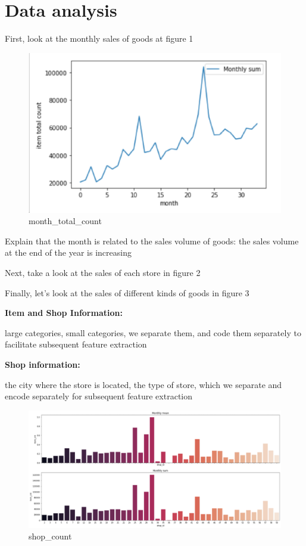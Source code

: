 \documentclass{amsart}
\begin{document}
\section{Data analysis}
First, look at the monthly sales of goods at figure 1\par
    \begin{figure}
        \includegraphics[scale=0.3]{picture/data_20.eps}
        \caption{month_total_count}\label{fig:1}
    \end{figure}
    Explain that the month is related to the sales volume of goods: the sales volume at the end of the year is increasing\par
    Next, take a look at the sales of each store in figure 2\par
    Finally, let's look at the sales of different kinds of goods in figure 3\par
    \textbf{Item and Shop Information:}\par
    large categories, small categories, we separate them, and code them separately to facilitate subsequent feature extraction\par
    \textbf{Shop information:}\par
    the city where the store is located, the type of store, which we separate and encode separately for subsequent feature extraction\par
    \begin{figure}[b]
        \includegraphics[scale=0.3]{picture/data_30.eps}
        \caption{shop_count}\label{fig:2}
    \end{figure}
\end{document}

